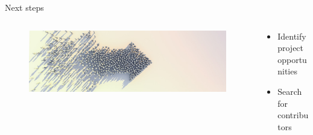 \documentclass[aspectratio=169]{beamer}
\begin{document}
\begin{frame}{Next steps}
    \begin{columns}[T]
        \begin{column}{0.3\textwidth}
            \begin{figure}[H]
                \centering
                \includegraphics[width=\textwidth]{./tex_images/next_steps.jpg}
            \end{figure}
        \end{column}
        \pause
        \begin{column}{0.65\textwidth}
            \vspace*{0.5cm}
            \begin{itemize}
                \item Identify project opportunities
                \item Search for contributors
            \end{itemize}
        \end{column}
    \end{columns}
    \pause


\end{frame}
\end{document}
